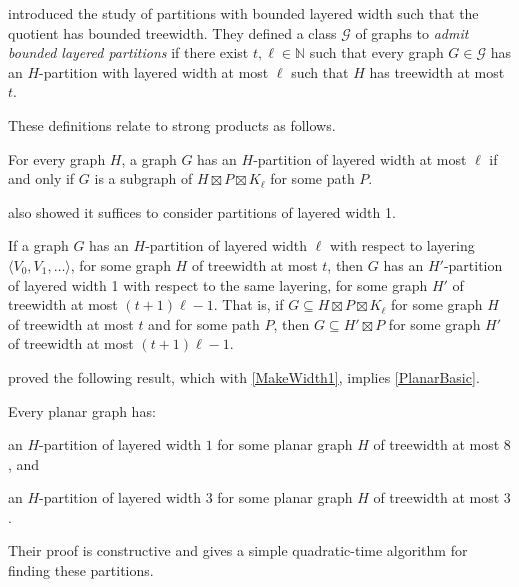 \documentclass{patmorin}
\begin{document}
\citet{dujmovic.joret.ea:planar} introduced the study of partitions with bounded layered width such that the quotient has bounded treewidth. They defined a class $\mathcal{G}$ of graphs to \emph{admit bounded layered partitions} if there exist $t,\ell\in\mathbb{N}$ such that every graph $G\in \mathcal{G}$ has an $H$-partition with layered width at most $\ell$ such that $H$ has treewidth at most $t$. 

These definitions relate to strong products as follows. 

\begin{lem} 
\label{PartitionProduct}
For every graph $H$, a graph $G$ has an $H$-partition of layered width at most $\ell$ if and only if $G$ is a subgraph of 
$H \boxtimes P \boxtimes K_\ell$ for some path $P$.
\end{lem}

\citet{dujmovic.joret.ea:planar} also showed it suffices to consider partitions of layered width 1.

\begin{lem} 
\label{MakeWidth1}
If a graph $G$ has an $H$-partition of layered width $\ell$ with respect to layering $\langle V_0,V_1,\dots\rangle$, for some graph $H$ of treewidth at most $t$, then $G$ has an $H'$-partition of layered width 1 with respect to the same layering, for some graph $H'$ of treewidth at most $(t+1)\ell-1$.  That is, if $G\subseteq H\boxtimes P\boxtimes K_\ell$ for some graph $H$ of treewidth at most $t$  and for some path $P$, then $G\subseteq H' \boxtimes P$ for some graph $H'$ of treewidth at most $(t+1)\ell-1$.
\end{lem}

\citet{dujmovic.joret.ea:planar} proved the following result, which with \cref{MakeWidth1}, implies \cref{PlanarBasic}. 

\begin{thm}
\label{PlanarPartition}
Every planar graph has:
\begin{compactitem}
\item an $H$-partition of layered width $1$ for some planar graph $H$ of treewidth at most $8$, and
\item an $H$-partition of layered width $3$ for some planar graph $H$ of treewidth at most $3$.
\end{compactitem}
\end{thm}
Their proof is constructive and gives a simple quadratic-time algorithm for finding these partitions.
\end{document}
